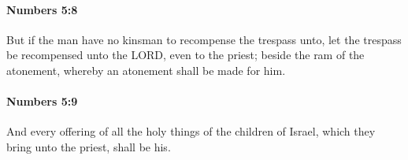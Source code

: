 		\paragraph{Numbers 5:8} %
			\label{NUMBERS-5-8}

			But if the man have no kinsman to recompense the trespass unto, let the trespass be recompensed unto the LORD, even to the priest; beside the ram of the atonement, whereby an atonement shall be made for him.


		\paragraph{Numbers 5:9} %
			\label{NUMBERS-5-9}

			And every offering of all the holy things of the children of Israel, which they bring unto the priest, shall be his.


